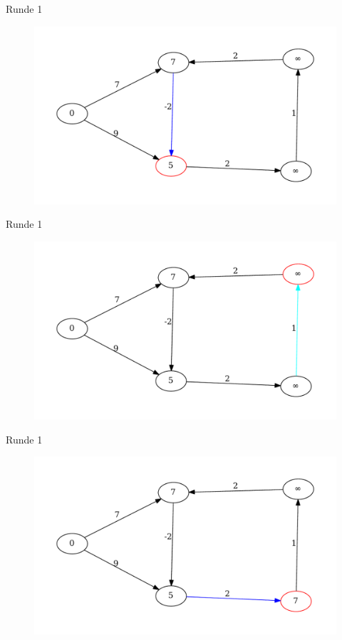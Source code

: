 \begin{frame}{Runde 1}
\begin{figure}[htbp]
\centering
\includegraphics[width=\linewidth]{bellman_ford_graphs/graph_03.pdf}
\end{figure}
\end{frame}

\begin{frame}{Runde 1}
\begin{figure}[htbp]
\centering
\includegraphics[width=\linewidth]{bellman_ford_graphs/graph_04.pdf}
\end{figure}
\end{frame}

\begin{frame}{Runde 1}
\begin{figure}[htbp]
\centering
\includegraphics[width=\linewidth]{bellman_ford_graphs/graph_05.pdf}
\end{figure}
\end{frame}

